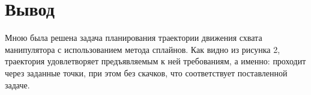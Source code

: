 \documentclass[a4paper,14pt]{extreport}
\begin{document}
	\section{Вывод}
	Мною была решена задача планирования траектории движения схвата манипулятора с использованием метода сплайнов. Как видно из рисунка 2, траектория удовлетворяет предъявляемым к ней требованиям, а именно: проходит через заданные точки, при этом без скачков, что соответствует поставленной задаче.
\end{document}

